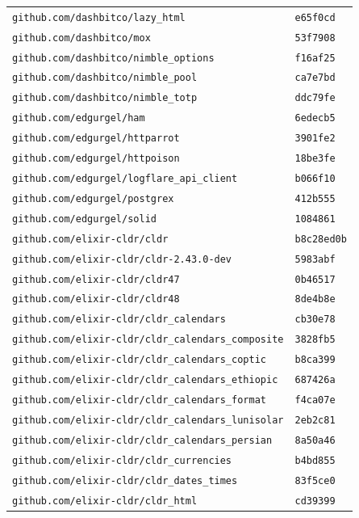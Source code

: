 \begin{longtable}{@{}p{} l@{}}
\texttt{github.com/dashbitco/lazy\_html} & \texttt{e65f0cd} \\
\texttt{github.com/dashbitco/mox} & \texttt{53f7908} \\
\texttt{github.com/dashbitco/nimble\_options} & \texttt{f16af25} \\
\texttt{github.com/dashbitco/nimble\_pool} & \texttt{ca7e7bd} \\
\texttt{github.com/dashbitco/nimble\_totp} & \texttt{ddc79fe} \\
\texttt{github.com/edgurgel/ham} & \texttt{6edecb5} \\
\texttt{github.com/edgurgel/httparrot} & \texttt{3901fe2} \\
\texttt{github.com/edgurgel/httpoison} & \texttt{18be3fe} \\
\texttt{github.com/edgurgel/logflare\_api\_client} & \texttt{b066f10} \\
\texttt{github.com/edgurgel/postgrex} & \texttt{412b555} \\
\texttt{github.com/edgurgel/solid} & \texttt{1084861} \\
\texttt{github.com/elixir-cldr/cldr} & \texttt{b8c28ed0b} \\
\texttt{github.com/elixir-cldr/cldr-2.43.0-dev} & \texttt{5983abf} \\
\texttt{github.com/elixir-cldr/cldr47} & \texttt{0b46517} \\
\texttt{github.com/elixir-cldr/cldr48} & \texttt{8de4b8e} \\
\texttt{github.com/elixir-cldr/cldr\_calendars} & \texttt{cb30e78} \\
\texttt{github.com/elixir-cldr/cldr\_calendars\_composite} & \texttt{3828fb5} \\
\texttt{github.com/elixir-cldr/cldr\_calendars\_coptic} & \texttt{b8ca399} \\
\texttt{github.com/elixir-cldr/cldr\_calendars\_ethiopic} & \texttt{687426a} \\
\texttt{github.com/elixir-cldr/cldr\_calendars\_format} & \texttt{f4ca07e} \\
\texttt{github.com/elixir-cldr/cldr\_calendars\_lunisolar} & \texttt{2eb2c81} \\
\texttt{github.com/elixir-cldr/cldr\_calendars\_persian} & \texttt{8a50a46} \\
\texttt{github.com/elixir-cldr/cldr\_currencies} & \texttt{b4bd855} \\
\texttt{github.com/elixir-cldr/cldr\_dates\_times} & \texttt{83f5ce0} \\
\texttt{github.com/elixir-cldr/cldr\_html} & \texttt{cd39399} \\

\end{longtable}
